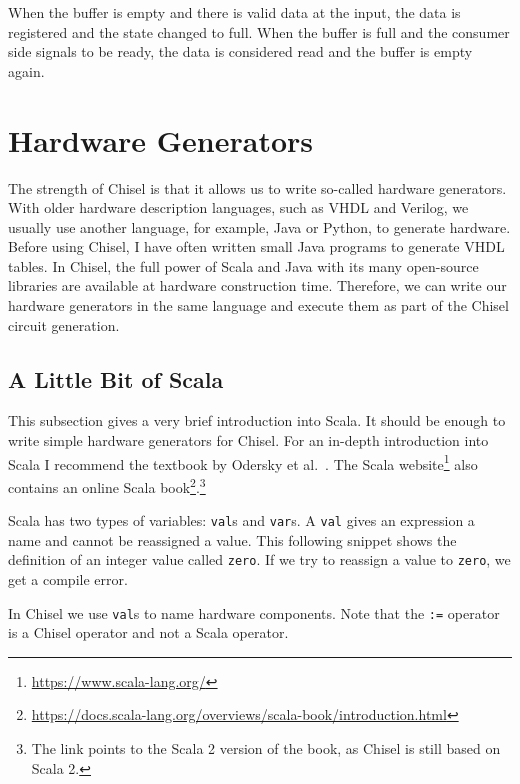 \documentclass[%
    10pt,
    headinclude, footexclude,
    openright, %
    notitlepage,
    cleardoubleempty,
    headsepline,
    pointlessnumbers,
    bibtotoc, idxtotoc,
    ]{scrbook}
\newcommand{\code}[1]{{\small{\texttt{#1}}}}
\newcommand{\myref}[2]{\href{#1}{#2}}
\renewcommand{\myref}[2]{{#2}{\footnote{\url{#1}}}}
\begin{document}
When the buffer is empty and there is valid data at the input, the data is registered
and the state changed to full. When the buffer is full and the consumer side signals
to be ready, the data is considered read and the buffer is empty again.



\chapter{Hardware Generators}
\label{ch:gen}

The strength of Chisel is that it allows us to write so-called hardware generators.
With older hardware description languages, such as VHDL and Verilog,
we usually use another language, for example, Java or Python, to generate hardware.
Before using Chisel, I have often written small Java programs to generate VHDL tables.
In Chisel, the full power of Scala and Java with its many open-source libraries
are available at hardware construction time. Therefore, we can write our hardware
generators in the same language and execute them as part of the Chisel circuit generation.

\section{A Little Bit of Scala}

This subsection gives a very brief introduction into Scala. It should be enough
to write simple hardware generators for Chisel.
For an in-depth introduction into Scala I recommend the textbook by Odersky et al.~\cite{Scala}.
The \myref{https://www.scala-lang.org/}{Scala website} also contains an
\myref{https://docs.scala-lang.org/overviews/scala-book/introduction.html}{online Scala book}.\footnote{The link
points to the Scala 2 version of the book, as Chisel is still based on Scala 2.}

Scala has two types of variables: \code{val}s and \code{var}s. A \code{val} gives an expression
a name and cannot be reassigned a value. This following snippet shows the definition of
an integer value called \code{zero}. If we try to reassign a value to \code{zero}, we get
a compile error.


\noindent In Chisel we use \code{val}s to name hardware components. Note that the \code{:=}
operator is a Chisel operator and not a Scala operator.
\end{document}
